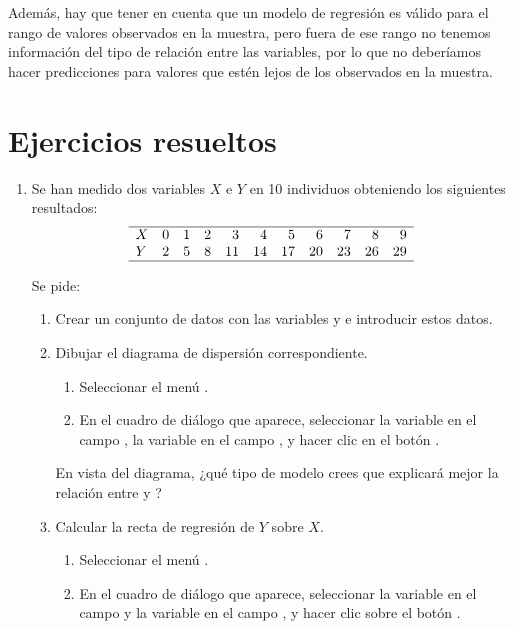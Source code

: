 Además, hay que tener en cuenta que un modelo de regresión es válido para el rango de valores observados en la muestra,
pero fuera de ese rango no tenemos información del tipo de relación entre las variables, por lo que no deberíamos hacer
predicciones para valores que estén lejos de los observados en la muestra.

\clearpage
\newpage



\section{Ejercicios resueltos}
\begin{enumerate}[leftmargin=*]
\item Se han medido dos variables $X$ e $Y$ en 10 individuos obteniendo los siguientes resultados:
\[
\begin{array}{lrrrrrrrrrr}
\hline
X & 0 & 1 & 2 & 3 & 4 & 5 & 6 & 7 & 8 & 9 \\
Y & 2 & 5 & 8 & 11 & 14 & 17 & 20 & 23 & 26 & 29\\
\hline
\end{array}
\]

Se pide:

\begin{enumerate}
\item  Crear un conjunto de datos con las variables  y  e introducir estos datos.
\item  Dibujar el diagrama de dispersión correspondiente.
\begin{indicacion}{
\begin{enumerate}
\item Seleccionar el menú .
\item En el cuadro de diálogo que aparece, seleccionar la variable  en el campo , la
variable  en el campo , y hacer clic en el botón .
\end{enumerate}}
\end{indicacion}

En vista del diagrama, ¿qué tipo de modelo crees que explicará mejor la relación entre   y ?

\item Calcular la recta de regresión de $Y$ sobre $X$.
\begin{indicacion}{
\begin{enumerate}
\item Seleccionar el menú .
\item En el cuadro de diálogo que aparece, seleccionar la variable  en el campo  y la variable  en el campo , y hacer clic sobre el botón
.
\end{enumerate}}
\end{indicacion}


\end{enumerate}
\end{enumerate}
